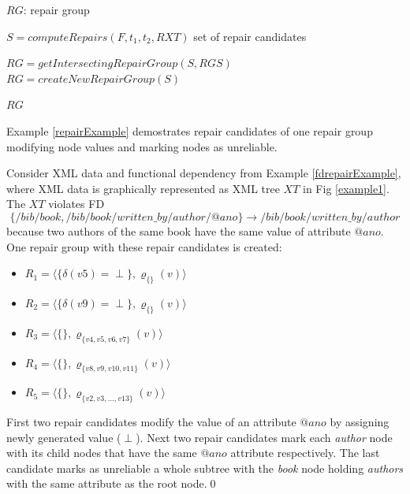 \begin{algorithm}
\caption{$computeRepairGroup(F, t_1, t_2, RXT, RGS)$}
\label{repairGroupAlgo}
\begin{algorithmic}[1]
\ENSURE $RG$: repair group

\STATE $S = computeRepairs(F, t_1, t_2, RXT)$ \COMMENT set of repair candidates

\STATE $RG = getIntersectingRepairGroup(S, RGS)$
\ELSE
\STATE $RG = createNewRepairGroup(S)$
\ENDIF

\RETURN $RG$
\end{algorithmic}
\end{algorithm}

Example \ref{repairExample} demostrates repair candidates of one repair group modifying node values and marking nodes as unreliable.

\begin{example}\label{repairExample}
Consider XML data and functional dependency from Example \ref{fdrepairExample}, where XML data is graphically represented as XML tree $XT$ in Fig \ref{example1}. The $XT$ violates FD $$\{/bib/book, /bib/book/written\_by/author/@ano\} \rightarrow /bib/book/written\_by/author$$ because two authors of the same book have the same value of attribute $@ano$. One repair group with these repair candidates is created:
\begin{itemize}
	\item $R_1 = \langle \{\delta(v5) = \perp\},\varrho_{\{\}}(v) \rangle$
    \item $R_2 = \langle \{\delta(v9) = \perp\},\varrho_{\{\}}(v) \rangle$
    \item $R_3 = \langle \{\},\varrho_{\{v4,v5,v6,v7\}}(v) \rangle$
    \item $R_4 = \langle \{\},\varrho_{\{v8,v9,v10,v11\}}(v) \rangle$
    \item $R_5 = \langle \{\},\varrho_{\{v2,v3,\dots,v13\}}(v) \rangle$
\end{itemize}

First two repair candidates modify the value of an attribute $@ano$ by assigning newly generated value ($\perp$). Next two repair candidates mark each \emph{author} node with its child nodes that have the same $@ano$ attribute respectively. The last candidate marks as unreliable a whole subtree with the \emph{book} node holding \emph{authors} with the same attribute as the root node.\qed
\end{example}

